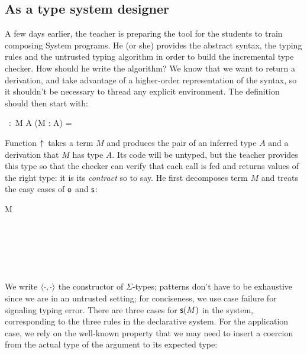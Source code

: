 \documentclass{llncs}
\begin{document}
\subsection{As a type system designer}
\label{sec:lang-incr}

A few days earlier, the teacher is preparing the tool for the students
to train composing System  programs. He (or she)
provides the abstract syntax, the typing rules and the untrusted
typing algorithm in order to build the incremental type checker. How
should he write the algorithm? We know that we want to return a
derivation, and take advantage of a higher-order representation of the
syntax, so it shouldn't be necessary to thread any explicit
environment. The definition should then start with:

\begin{mathleft}
  \finfer{}\ :\ \prd M {} \sig A {} (\vdash M : A) =
\end{mathleft}

\noindent
Function $\uparrow\!{}$ takes a term $M$ and produces the pair of an
inferred type $A$ and a derivation that $M$ has type $A$. Its code
will be untyped, but the teacher provides this type so that the
checker can verify that each call is fed and returns values of the
right type: it is its \emph{contract} so to say. He first decomposes
term $M$ and treats the easy cases of $\text{\textsf{o}}$ and $\text{\textsf{s}}$:

\begin{mathleft}
  \lamd M  \\
  \quad\caseb{\z}  \\
  \quad{}
   \\
  \quad\quad{}
   \\
  \quad\quad{}
   \\
  \quad\quad{}
   \\
\end{mathleft}

\noindent
We write $\langle{\cdot}, {\cdot}\rangle$ the constructor of $\Sigma$-types;
patterns don't have to be exhaustive since we are in an untrusted
setting; for conciseness, we use case failure for signaling typing
error. There are three cases for $\text{\textsf{s}} ({M})$ in the system, corresponding
to the three rules in the declarative system. For the application
case, we rely on the well-known property that we may need to insert a
coercion from the actual type of the argument to its expected type:
\end{document}

